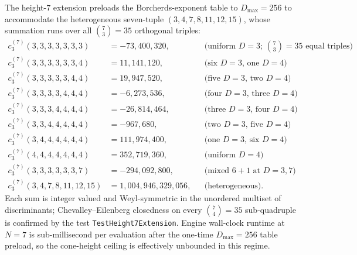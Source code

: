 \begin{remark}[Cone-height \texorpdfstring{$N=7$}{N=7} principal instances]
\label{rem:bkm-drinfeld-J-engine-height-7}
The height-$7$ extension preloads the Borcherds-exponent table to
$D_{\max}=256$ to accommodate the heterogeneous seven-tuple
$(3,4,7,8,11,12,15)$, whose summation runs over all
$\binom 73=35$ orthogonal triples:
\[
\begin{aligned}
c_3^{(7)}(3,3,3,3,3,3,3) &= -73{,}400{,}320,
&&\text{(uniform $D=3$; $\binom 73=35$ equal triples)}\\
c_3^{(7)}(3,3,3,3,3,3,4) &= 11{,}141{,}120,
&&\text{(six $D=3$, one $D=4$)}\\
c_3^{(7)}(3,3,3,3,3,4,4) &= 19{,}947{,}520,
&&\text{(five $D=3$, two $D=4$)}\\
c_3^{(7)}(3,3,3,3,4,4,4) &= -6{,}273{,}536,
&&\text{(four $D=3$, three $D=4$)}\\
c_3^{(7)}(3,3,3,4,4,4,4) &= -26{,}814{,}464,
&&\text{(three $D=3$, four $D=4$)}\\
c_3^{(7)}(3,3,4,4,4,4,4) &= -967{,}680,
&&\text{(two $D=3$, five $D=4$)}\\
c_3^{(7)}(3,4,4,4,4,4,4) &= 111{,}974{,}400,
&&\text{(one $D=3$, six $D=4$)}\\
c_3^{(7)}(4,4,4,4,4,4,4) &= 352{,}719{,}360,
&&\text{(uniform $D=4$)}\\
c_3^{(7)}(3,3,3,3,3,3,7) &= -294{,}092{,}800,
&&\text{(mixed $6\!+\!1$ at $D=3,7$)}\\
c_3^{(7)}(3,4,7,8,11,12,15) &= 1{,}004{,}946{,}329{,}056,
&&\text{(heterogeneous).}
\end{aligned}
\]
Each sum is integer valued and Weyl-symmetric in the unordered
multiset of discriminants; Chevalley--Eilenberg closedness on every
$\binom 74=35$ sub-quadruple is confirmed by the test
\texttt{TestHeight7Extension}. Engine wall-clock runtime at $N=7$ is
sub-millisecond per evaluation after the one-time
$D_{\max}=256$ table preload, so the cone-height ceiling is
effectively unbounded in this regime.
\end{remark}

